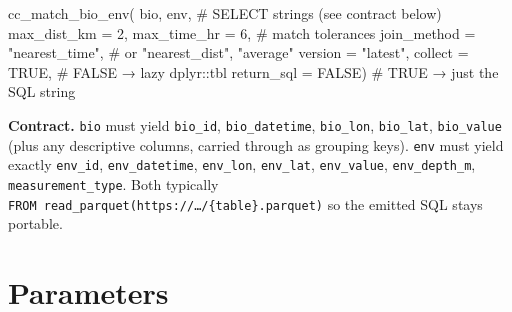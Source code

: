 \documentclass[
  letterpaper,
  DIV=11,
  numbers=noendperiod]{scrreprt}
\newenvironment{Shaded}{\begin{snugshade}}{\end{snugshade}}
\newcommand{\AttributeTok}[1]{\textcolor[rgb]{0.40,0.45,0.13}{#1}}
\newcommand{\CommentTok}[1]{\textcolor[rgb]{0.37,0.37,0.37}{#1}}
\newcommand{\ConstantTok}[1]{\textcolor[rgb]{0.56,0.35,0.01}{#1}}
\newcommand{\DecValTok}[1]{\textcolor[rgb]{0.68,0.00,0.00}{#1}}
\newcommand{\FunctionTok}[1]{\textcolor[rgb]{0.28,0.35,0.67}{#1}}
\newcommand{\NormalTok}[1]{\textcolor[rgb]{0.00,0.23,0.31}{#1}}
\newcommand{\StringTok}[1]{\textcolor[rgb]{0.13,0.47,0.30}{#1}}
\begin{document}
\begin{Shaded}
\begin{Highlighting}[]
\FunctionTok{cc\_match\_bio\_env}\NormalTok{(}
\NormalTok{  bio, env,                                  }\CommentTok{\# SELECT strings (see contract below)}
  \AttributeTok{max\_dist\_km =} \DecValTok{2}\NormalTok{, }\AttributeTok{max\_time\_hr =} \DecValTok{6}\NormalTok{,          }\CommentTok{\# match tolerances}
  \AttributeTok{join\_method =} \StringTok{"nearest\_time"}\NormalTok{,              }\CommentTok{\# or "nearest\_dist", "average"}
  \AttributeTok{version     =} \StringTok{"latest"}\NormalTok{,}
  \AttributeTok{collect     =} \ConstantTok{TRUE}\NormalTok{,                        }\CommentTok{\# FALSE → lazy dplyr::tbl}
  \AttributeTok{return\_sql  =} \ConstantTok{FALSE}\NormalTok{)                       }\CommentTok{\# TRUE  → just the SQL string}
\end{Highlighting}
\end{Shaded}

\textbf{Contract.} \texttt{bio} must yield \texttt{bio\_id},
\texttt{bio\_datetime}, \texttt{bio\_lon}, \texttt{bio\_lat},
\texttt{bio\_value} (plus any descriptive columns, carried through as
grouping keys). \texttt{env} must yield exactly \texttt{env\_id},
\texttt{env\_datetime}, \texttt{env\_lon}, \texttt{env\_lat},
\texttt{env\_value}, \texttt{env\_depth\_m}, \texttt{measurement\_type}.
Both typically
\texttt{FROM\ read\_parquet(\textquotesingle{}https://…/\{table\}.parquet\textquotesingle{})}
so the emitted SQL stays portable.

\section{Parameters}\label{parameters}
\end{document}
